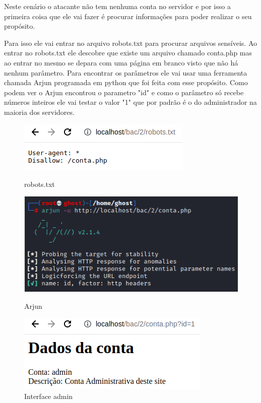 \documentclass{report}
\begin{document}
Neste cenário o atacante não tem nenhuma conta no servidor e por isso a primeira coisa que ele vai fazer é procurar informações para poder realizar o seu propósito. 

Para isso ele vai entrar no arquivo robots.txt para procurar arquivos sensíveis. Ao entrar no robots.txt ele descobre que existe um arquivo chamado conta.php mas ao entrar no mesmo se depara com uma página em branco visto que não há nenhum parâmetro. Para encontrar os parâmetros ele vai usar uma ferramenta chamada Arjun programada em python que foi feita com esse propósito. Como podem ver o Arjun encontrou o parametro "id" e como o parâmetro só recebe números inteiros ele vai testar o valor "1" que por padrão é o do administrador na maioria dos servidores.
\cite{arjumgit}
\begin{figure}[!htb]
  \includegraphics[width=\linewidth]{imagesbac/bac4.png}
  \caption{robots.txt}\label{fig:robots}
\endminipage\hfill
{}
  \includegraphics[width=\linewidth]{imagesbac/bac5.png}
  \caption{Arjun}\label{fig:arjun}
\endminipage\hfill
{}%
  \includegraphics[width=\linewidth]{imagesbac/bac6.png}
  \caption{Interface admin}\label{fig:iadmin}
\endminipage
\end{figure}
\end{document}
